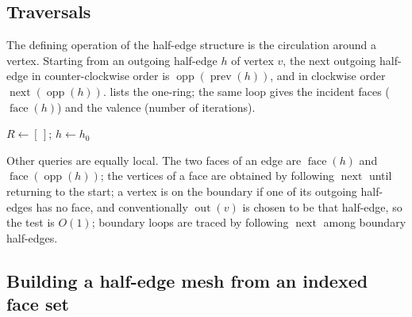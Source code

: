 \subsection{Traversals}

The defining operation of the half-edge structure is the circulation around a vertex. Starting
from an outgoing half-edge $h$ of vertex $v$, the next outgoing half-edge in counter-clockwise
order is $\operatorname{opp}(\operatorname{prev}(h))$, and in clockwise order
$\operatorname{next}(\operatorname{opp}(h))$.  lists the one-ring; the same loop
gives the incident faces ($\operatorname{face}(h)$) and the valence (number of iterations).

\begin{algorithm}[tbp]
\caption{One-ring of a vertex in a half-edge mesh.}\label{alg:onering}
$R\gets[\,]$; $h\gets h_0$\;
\end{algorithm}

Other queries are equally local. The two faces of an edge are $\operatorname{face}(h)$ and
$\operatorname{face}(\operatorname{opp}(h))$; the vertices of a face are obtained by following
$\operatorname{next}$ until returning to the start; a vertex is on the boundary if one of its
outgoing half-edges has no face, and conventionally $\operatorname{out}(v)$ is chosen to be that
half-edge, so the test is $O(1)$; boundary loops are traced by following $\operatorname{next}$
among boundary half-edges.


\subsection{Building a half-edge mesh from an indexed face set}

